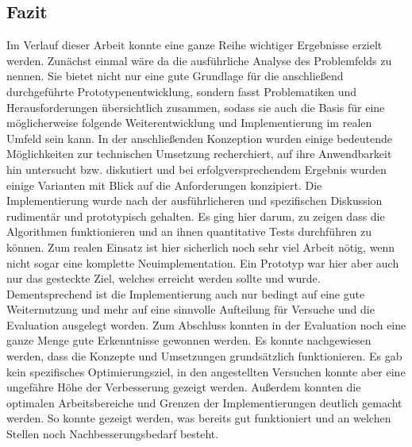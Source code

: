 \subsection{Fazit}

Im Verlauf dieser Arbeit konnte eine ganze Reihe wichtiger Ergebnisse erzielt werden. Zunächst einmal wäre da die ausführliche Analyse des Problemfelds zu nennen. Sie bietet nicht nur eine gute Grundlage für die anschließend durchgeführte Prototypenentwicklung, sondern fasst Problematiken und Herausforderungen übersichtlich zusammen, sodass sie auch die Basis für eine möglicherweise folgende Weiterentwicklung und Implementierung im realen Umfeld sein kann. In der anschließenden Konzeption wurden einige bedeutende Möglichkeiten zur technischen Umsetzung recherchiert, auf ihre Anwendbarkeit hin untersucht bzw. diskutiert und bei erfolgversprechendem Ergebnis wurden einige Varianten mit Blick auf die Anforderungen konzipiert. Die Implementierung wurde nach der ausführlicheren und spezifischen Diskussion rudimentär und prototypisch gehalten. Es ging hier darum, zu zeigen dass die Algorithmen funktionieren und an ihnen quantitative Tests durchführen zu können. Zum realen Einsatz ist hier sicherlich noch sehr viel Arbeit nötig, wenn nicht sogar eine komplette Neuimplementation. Ein Prototyp war hier aber auch nur das gesteckte Ziel, welches erreicht werden sollte und wurde. Dementsprechend ist die Implementierung auch nur bedingt auf eine gute Weiternutzung und mehr auf eine sinnvolle Aufteilung für Versuche und die Evaluation ausgelegt worden. Zum Abschluss konnten in der Evaluation noch eine ganze Menge gute Erkenntnisse gewonnen werden. Es konnte nachgewiesen werden, dass die Konzepte und Umsetzungen grundsätzlich funktionieren. Es gab kein spezifisches Optimierungsziel, in den angestellten Versuchen konnte aber eine ungefähre Höhe der Verbesserung gezeigt werden. Außerdem konnten die optimalen Arbeitsbereiche und Grenzen der Implementierungen deutlich gemacht werden. So konnte gezeigt werden, was bereits gut funktioniert und an welchen Stellen noch Nachbesserungsbedarf besteht.

